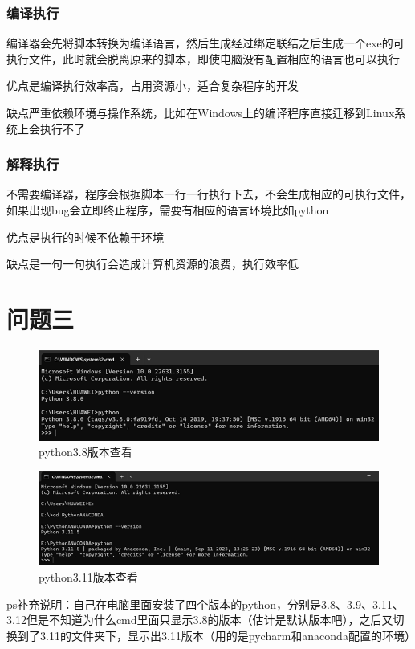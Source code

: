 \documentclass[10pt]{article}
\begin{document}
		\subsubsection{编译执行}
	编译器会先将脚本转换为编译语言，然后生成经过绑定联结之后生成一个exe的可执行文件，此时就会脱离原来的脚本，即使电脑没有配置相应的语言也可以执行 \par
	优点是编译执行效率高，占用资源小，适合复杂程序的开发\par
	缺点严重依赖环境与操作系统，比如在Windows上的编译程序直接迁移到Linux系统上会执行不了
		\subsubsection{解释执行}
	不需要编译器，程序会根据脚本一行一行执行下去，不会生成相应的可执行文件，如果出现bug会立即终止程序，需要有相应的语言环境比如python \par
	优点是执行的时候不依赖于环境\par
	缺点是一句一句执行会造成计算机资源的浪费，执行效率低
	
\section{问题三}
	\begin{figure}[htbp]
		\centering
		\includegraphics[scale=1]{python3.8版本查看}
		\caption{python3.8版本查看}
	\end{figure}
	\begin{figure}[htbp]
		\centering
		\includegraphics[scale=1]{python3.11版本查看}
		\caption{python3.11版本查看}
	\end{figure}
	ps补充说明：自己在电脑里面安装了四个版本的python，分别是3.8、3.9、3.11、3.12但是不知道为什么cmd里面只显示3.8的版本（估计是默认版本吧），之后又切换到了3.11的文件夹下，显示出3.11版本（用的是pycharm和anaconda配置的环境）
	
\end{document}
